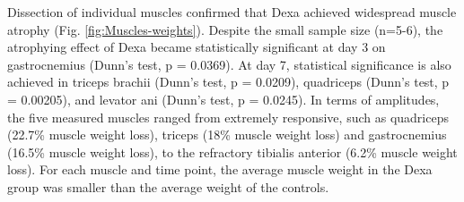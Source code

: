 \documentclass[12pt,english]{report}\usepackage[]{graphicx}\usepackage[]{color}
\begin{document}
Dissection of individual muscles confirmed that Dexa achieved widespread
muscle atrophy (Fig. \ref{fig:Muscles-weights}). Despite the small
sample size (n=5-6), the atrophying effect of Dexa became statistically
significant at day 3 on gastrocnemius (Dunn's test, p = 0.0369).
At day 7, statistical significance is also achieved in triceps brachii
(Dunn's test, p = 0.0209),
quadriceps (Dunn's test, p = 0.00205),
and levator ani (Dunn's test, p = 0.0245).
In terms of amplitudes, the five measured muscles ranged from extremely
responsive, such as quadriceps (22.7\%
muscle weight loss), triceps (18\%
muscle weight loss) and gastrocnemius (16.5\%
muscle weight loss), to the refractory tibialis anterior (6.2\%
muscle weight loss). For each muscle and time point, the average muscle
weight in the Dexa group was smaller than the average weight of the
controls.
\end{document}
